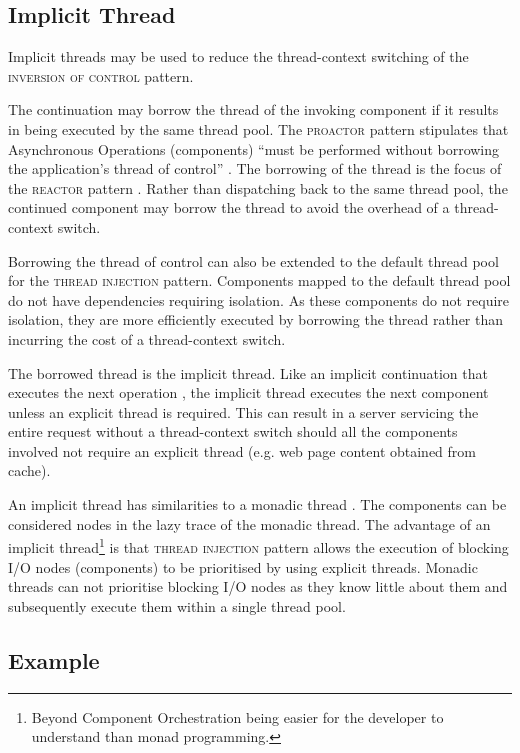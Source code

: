 \documentclass[prodmode]{style/acmlarge}
\begin{document}
\subsection{Implicit Thread}

Implicit threads may be used to reduce the thread-context switching of the
\textsc{inversion of control} pattern.

The continuation may borrow the thread of the invoking component if it results
in being executed by the same thread pool.  The \textsc{proactor} pattern
stipulates that Asynchronous Operations (components) ``must be performed without
borrowing the application's thread of control'' \cite[p. 8]{proactor}.  The
borrowing of the thread is the focus of the \textsc{reactor} pattern
\cite{reactor}.  Rather than dispatching back to the same thread pool, the
continued component may borrow the thread to avoid the overhead of a
thread-context switch.

Borrowing the thread of control can also be extended to the default thread pool
for the \textsc{thread injection} pattern.  Components mapped to the default
thread pool do not have dependencies requiring isolation.  As these components
do not require isolation, they are more efficiently executed by borrowing the
thread rather than incurring the cost of a thread-context switch.

The borrowed thread is the implicit thread.  Like an implicit continuation that
executes the next operation \cite{continuations}, the implicit thread executes
the next component unless an explicit thread is required.  This can result in
a server servicing the entire request without a thread-context switch
should all the components involved not require an explicit thread
(e.g. web page content obtained from cache).

An implicit thread has similarities to a monadic thread \cite{monadic-thread}.
The components can be considered nodes in the lazy trace of the monadic thread.
The advantage of an implicit thread\footnote{Beyond Component Orchestration
being easier for the developer to understand than monad programming.} is that
\textsc{thread injection} pattern allows the execution of blocking I/O nodes
(components) to be prioritised by using explicit threads.  Monadic threads can
not prioritise blocking I/O nodes as they know little about them and
subsequently execute them within a single thread pool.


\subsection{Example}
\end{document}
